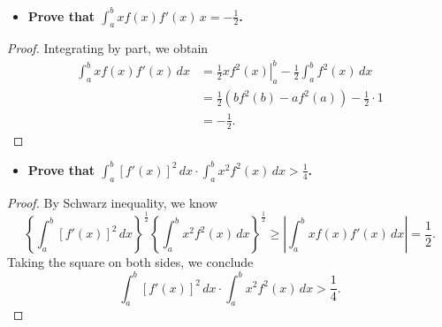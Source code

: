 \begin{Exercise}
	\begin{itemize}
		\item \textbf{Prove that $\int_{a}^{b}x f(x) f'(x)\,x = -\frac{1}{2}$.}
	\end{itemize}
	\begin{proof}
		Integrating by part, we obtain
		\begin{align*}
		\int_{a}^{b} x f(x) f'(x)\,dx
		&= \left. \frac{1}{2}x f^2(x) \right|_{a}^{b} - \frac{1}{2} \int_{a}^{b} f^2(x)\,dx \\
		&=\frac{1}{2}\left( b f^2(b) - a f^2(a) \right) - \frac{1}{2}\cdot 1 \\
		&= -\frac{1}{2}.
		\end{align*}
	\end{proof}
	
	\begin{itemize}
		\item \textbf{Prove that $\int_{a}^{b}[f'(x)]^2\,dx\cdot \int_{a}^{b}x^2 f^2(x)\,dx > \frac{1}{4}$.} 
	\end{itemize}
	
	\begin{proof}
		By Schwarz inequality, we know
		$$
		\left\{ \int_{a}^{b} [f'(x)]^2\,dx \right\}^{\frac{1}{2}} \left\{ \int_{a}^{b} x^2 f^2(x)\,dx \right\}^{\frac{1}{2}}
		\geq \left| \int_{a}^{b} x f(x) f'(x)\,dx \right|
		= \frac{1}{2}.
		$$
		Taking the square on both sides, we conclude
		$$
		\int_{a}^{b} [f'(x)]^2\,dx \cdot \int_{a}^{b} x^2 f^2(x)\,dx > \frac{1}{4}.
		$$ 
	\end{proof}
\end{Exercise}